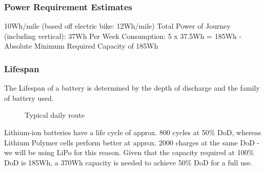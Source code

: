 \documentclass[journal,10pt]{IEEEtran}
\begin{document}
        \subsubsection{Power Requirement Estimates}
            10Wh/mile (based off electric bike: 12Wh/mile)
            Total Power of Journey (including vertical): 37Wh
            Per Week Consumption: 5 x 37.5Wh = 185Wh
            -Absolute Minimum Required Capacity of 185Wh
        \subsubsection{Lifespan}
            The Lifespan of a battery is determined by the depth of discharge and the family of battery used.
            \begin{figure}[H]
                \centering
                \caption{Typical daily route}
                \label{fig:route}
            \end{figure}
            Lithium-ion batteries have a life cycle of approx. 800 cycles at 50\% DoD, whereas Lithium Polymer cells perform better at approx. 2000 charges at the same DoD - we will be using LiPo for this reason. Given that the capacity required at 100\% DoD is 185Wh, a 370Wh capacity is needed to achieve 50\% DoD for a full use.
\end{document}
